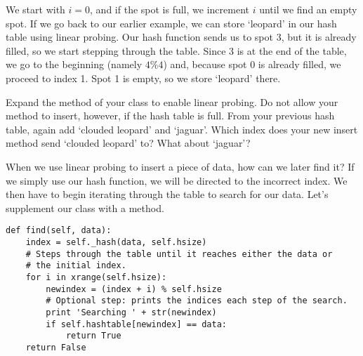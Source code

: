 We start with $i = 0$, and if the spot is full, we increment $i$ until we find an empty spot.
If we go back to our earlier example, we can store `leopard' in our hash table using linear probing.
Our hash function sends us to spot 3, but it is already filled, so we start stepping through the table.
Since 3 is at the end of the table, we go to the beginning (namely $4 \% 4$) and, because spot 0 is already filled, we proceed to index 1.
Spot 1 is empty, so we store `leopard' there.
\begin{center}
\end{center}
\begin{problem}
Expand the  method of your  class to enable linear probing.
Do not allow your method to insert, however, if the hash table is full.
From your previous hash table, again add `clouded leopard' and `jaguar'.
Which index does your new insert method send `clouded leopard' to?
What about `jaguar'?
\label{prob:Linear probing insert}
\end{problem}

When we use linear probing to insert a piece of data, how can we later find it?
If we simply use our hash function, we will be directed to the incorrect index.
We then have to begin iterating through the table to search for our data.
Let's supplement our  class with a  method.
\begin{lstlisting}
def find(self, data):
    index = self._hash(data, self.hsize)
    # Steps through the table until it reaches either the data or 
    # the initial index.
    for i in xrange(self.hsize):
        newindex = (index + i) % self.hsize
        # Optional step: prints the indices each step of the search.
        print 'Searching ' + str(newindex)
        if self.hashtable[newindex] == data:
            return True
    return False
\end{lstlisting}


